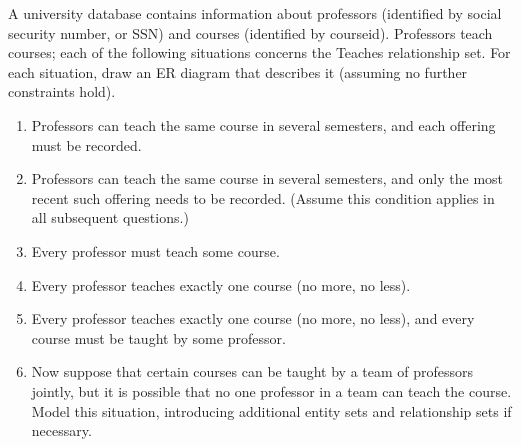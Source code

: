 \begin{problem}{2.2}

  A university database contains information about professors (identified by social security number, or SSN) and
  courses (identified by courseid). Professors teach courses; each of the following situations concerns the Teaches
  relationship set. For each situation, draw an ER diagram that describes it (assuming no further constraints hold).

  \begin{enumerate}
    \item Professors can teach the same course in several semesters, and each offering must be recorded.
    \item Professors can teach the same course in several semesters, and only the most recent such offering needs to be
      recorded. (Assume this condition applies in all subsequent questions.)
    \item Every professor must teach some course.
    \item Every professor teaches exactly one course (no more, no less).
    \item Every professor teaches exactly one course (no more, no less), and every course must be taught by some professor.
    \item Now suppose that certain courses can be taught by a team of professors jointly, but it is possible that no one
      professor in a team can teach the course. Model this situation, introducing additional entity sets and relationship
      sets if necessary.
  \end{enumerate}


\end{problem}
